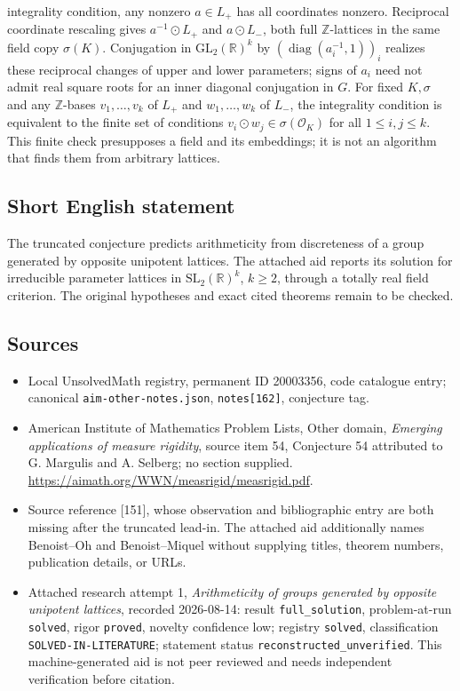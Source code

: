 \documentclass[11pt]{article}
\newcommand{\Z}{\mathbb{Z}}
\newcommand{\R}{\mathbb{R}}
\begin{document}
integrality condition, any nonzero \(a\in L_+\) has all coordinates nonzero. Reciprocal coordinate rescaling gives \(a^{-1}\odot L_+\) and \(a\odot L_-\), both full \(\Z\)-lattices in the same field copy \(\sigma(K)\). Conjugation in \(\mathrm{GL}_2(\R)^k\) by \((\operatorname{diag}(a_i^{-1},1))_i\) realizes these reciprocal changes of upper and lower parameters; signs of \(a_i\) need not admit real square roots for an inner diagonal conjugation in \(G\). For fixed \(K,\sigma\) and any \(\Z\)-bases \(v_1,\ldots,v_k\) of \(L_+\) and \(w_1,\ldots,w_k\) of \(L_-\), the integrality condition is equivalent to the finite set of conditions \(v_i\odot w_j\in\sigma(\mathcal O_K)\) for all \(1\le i,j\le k\). This finite check presupposes a field and its embeddings; it is not an algorithm that finds them from arbitrary lattices.
\subsection{Short English statement}
The truncated conjecture predicts arithmeticity from discreteness of a group generated by opposite unipotent lattices. The attached aid reports its solution for irreducible parameter lattices in \(\mathrm{SL}_2(\R)^k\), \(k\ge2\), through a totally real field criterion. The original hypotheses and exact cited theorems remain to be checked.
\subsection{Sources}
\begin{itemize}\item Local UnsolvedMath registry, permanent ID 20003356, code catalogue entry; canonical \texttt{aim-other-notes.json}, \texttt{notes[162]}, conjecture tag.\item American Institute of Mathematics Problem Lists, Other domain, \emph{Emerging applications of measure rigidity}, source item 54, Conjecture 54 attributed to G. Margulis and A. Selberg; no section supplied. \url{https://aimath.org/WWN/measrigid/measrigid.pdf}.\item Source reference [151], whose observation and bibliographic entry are both missing after the truncated lead-in. The attached aid additionally names Benoist--Oh and Benoist--Miquel without supplying titles, theorem numbers, publication details, or URLs.\item Attached research attempt 1, \emph{Arithmeticity of groups generated by opposite unipotent lattices}, recorded 2026-08-14: result \texttt{full\_solution}, problem-at-run \texttt{solved}, rigor \texttt{proved}, novelty confidence low; registry \texttt{solved}, classification \texttt{SOLVED-IN-LITERATURE}; statement status \texttt{reconstructed\_unverified}. This machine-generated aid is not peer reviewed and needs independent verification before citation.\end{itemize}
\end{document}
